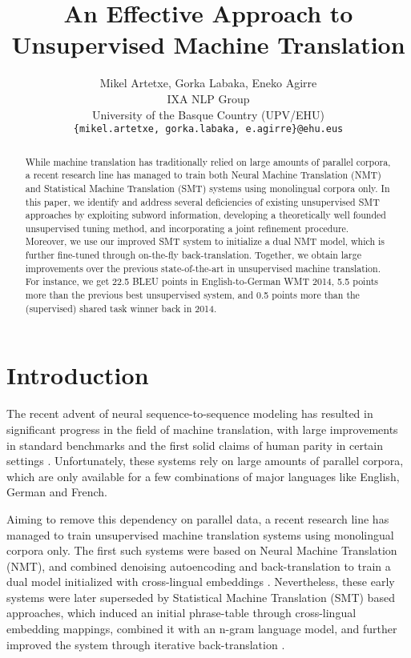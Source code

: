 \documentclass[11pt,a4paper]{article}
\title{An Effective Approach to Unsupervised Machine Translation}
\author{Mikel Artetxe, Gorka Labaka, Eneko Agirre \\
  IXA NLP Group \\
  University of the Basque Country (UPV/EHU) \\
  \texttt{\{mikel.artetxe, gorka.labaka, e.agirre\}@ehu.eus} \\}
\date{}
\begin{document}
\maketitle
\begin{abstract}
While machine translation has traditionally relied on large amounts of parallel corpora, a recent research line has managed to train both Neural Machine Translation (NMT) and Statistical Machine Translation (SMT) systems using monolingual corpora only. In this paper, we identify and address several deficiencies of existing unsupervised SMT approaches by exploiting subword information, developing a theoretically well founded unsupervised tuning method, and incorporating a joint refinement procedure. Moreover, we use our improved SMT system to initialize a dual NMT model, which is further fine-tuned through on-the-fly back-translation. Together, we obtain large improvements over the previous state-of-the-art in unsupervised machine translation. For instance, we get 22.5 BLEU points in English-to-German WMT 2014, 5.5 points more than the previous best unsupervised system, and 0.5 points more than the (supervised) shared task winner back in 2014.
\end{abstract}


\section{Introduction}
\label{sec:introduction}

The recent advent of neural sequence-to-sequence modeling has resulted in significant progress in the field of machine translation, with large improvements in standard benchmarks \citep{vaswani2017attention,edunov2018understanding} and the first solid claims of human parity in certain settings \citep{hassan2018achieving}. Unfortunately, these systems rely on large amounts of parallel corpora, which are only available for a few combinations of major languages like English, German and French.

Aiming to remove this dependency on parallel data, a recent research line has managed to train unsupervised machine translation systems using monolingual corpora only. The first such systems were based on Neural Machine Translation (NMT), and combined denoising autoencoding and back-translation to train a dual model initialized with cross-lingual embeddings \citep{artetxe2018unmt,lample2018unsupervised}. Nevertheless, these early systems were later superseded by Statistical Machine Translation (SMT) based approaches, which induced an initial phrase-table through cross-lingual embedding mappings, combined it with an n-gram language model, and further improved the system through iterative back-translation \citep{lample2018phrase,artetxe2018usmt}.
\end{document}
